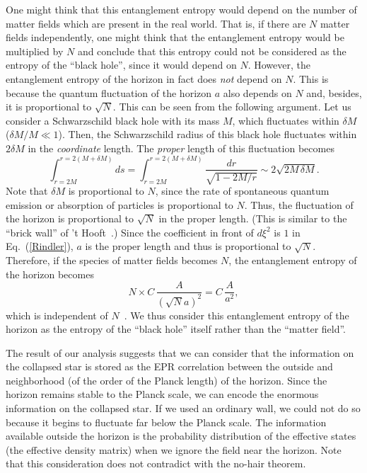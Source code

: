 \documentclass[12pt,epsf]{article}
\begin{document}
One might think that this entanglement entropy
would depend on the number of matter fields which are present
in the real world.
That is, if there are $N$ matter fields independently,
one might think that
the entanglement entropy would be multiplied by $N$
and conclude that this entropy
could not be considered as the entropy of
the ``black hole'', since it would depend on $N$.
However, the entanglement entropy of the horizon
in fact does {\em not} depend on $N$.
This is because the quantum fluctuation of the horizon $a$
also depends on $N$ and, besides,
it is proportional to $\sqrt{N}$.
This can be seen from the following argument.
Let us consider a Schwarzschild black hole with its mass $M$,
which fluctuates within $\delta M$ ($\delta M/M\ll 1$).
Then, the Schwarzschild radius of this black hole fluctuates
within $2\delta M$ in the {\em coordinate} length.
The {\em proper} length of this fluctuation becomes
\begin{equation}
\int^{r=2(M+\delta M)}_{r=2M}ds=\int^{r=2(M+\delta M)}_{r=2M}
\frac{dr}{\sqrt{1-2M/r}} \sim 2\sqrt{2M\,\delta M}.
\end{equation}
Note that $\delta M$ is proportional to $N$,
since the rate of spontaneous quantum emission or
absorption of particles is proportional to $N$.
Thus, the fluctuation of the horizon is proportional to
$\sqrt{N}$ in the proper length.
(This is similar to the ``brick wall''
of 't Hooft~\cite{tHooft85}.)
Since the coefficient in front of $d\xi^2$ is $1$ in
Eq.~(\ref{Rindler}), $a$ is the proper length and thus
is proportional to $\sqrt{N}$.
Therefore,
if the species of matter fields becomes $N$,
the entanglement entropy of the horizon becomes
\begin{equation}
N\times
C\,\frac{A}{(\sqrt{N}a)^2}=C\,\frac{A}{a^2},
\end{equation}
which is independent of $N$~\cite{FroNov93}.
We thus consider this entanglement entropy of the horizon
as the entropy of the ``black hole'' itself rather than
the ``matter field''.

The result of our analysis suggests that
we can consider that the information on the collapsed
star is stored as the EPR correlation between
the outside and neighborhood
(of the order of the Planck length) of the horizon.
Since the horizon remains stable to the Planck scale,
we can encode the enormous information on
the collapsed star.
If we used an ordinary wall,
we could not do so because it begins to fluctuate
far below the Planck scale.
The information available outside the horizon is
the probability distribution of the effective states
(the effective density matrix)
when we ignore the field near the horizon.
Note that
this consideration does not contradict with
the no-hair theorem.
\end{document}
